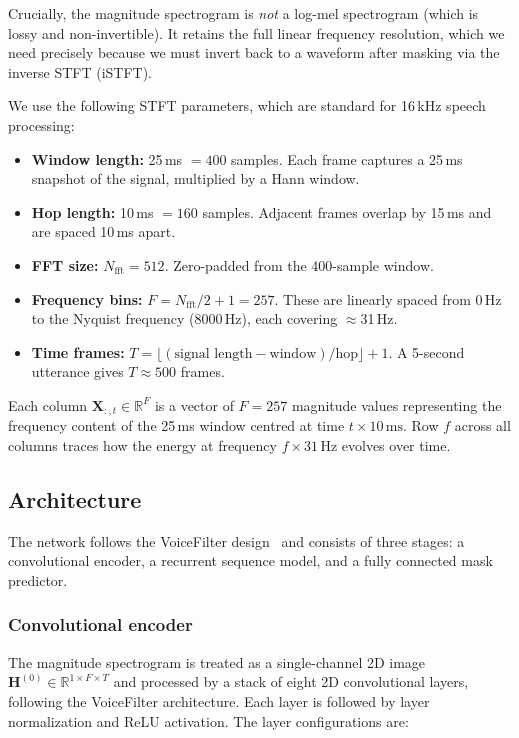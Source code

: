 \documentclass{article}
\begin{document}
Crucially, the magnitude spectrogram is \emph{not} a log-mel spectrogram (which is lossy and non-invertible). It retains the full linear frequency resolution, which we need precisely because we must invert back to a waveform after masking via the inverse STFT (iSTFT).

We use the following STFT parameters, which are standard for 16\,kHz speech processing:
\begin{itemize}
    \item \textbf{Window length:} 25\,ms $= 400$ samples. Each frame captures a 25\,ms snapshot of the signal, multiplied by a Hann window.
    \item \textbf{Hop length:} 10\,ms $= 160$ samples. Adjacent frames overlap by 15\,ms and are spaced 10\,ms apart.
    \item \textbf{FFT size:} $N_{\text{fft}} = 512$. Zero-padded from the 400-sample window.
    \item \textbf{Frequency bins:} $F = N_{\text{fft}}/2 + 1 = 257$. These are linearly spaced from 0\,Hz to the Nyquist frequency (8000\,Hz), each covering $\approx$31\,Hz.
    \item \textbf{Time frames:} $T = \lfloor (\text{signal length} - \text{window}) / \text{hop} \rfloor + 1$. A 5-second utterance gives $T \approx 500$ frames.
\end{itemize}

Each column $\mathbf{X}_{:,t} \in \mathbb{R}^F$ is a vector of $F = 257$ magnitude values representing the frequency content of the 25\,ms window centred at time $t \times 10\,\text{ms}$. Row $f$ across all columns traces how the energy at frequency $f \times 31\,\text{Hz}$ evolves over time.

\subsection{Architecture}

The network follows the VoiceFilter design~\citep{VoiceFilter} and consists of three stages: a convolutional encoder, a recurrent sequence model, and a fully connected mask predictor.

\subsubsection{Convolutional encoder}
The magnitude spectrogram is treated as a single-channel 2D image $\mathbf{H}^{(0)} \in \mathbb{R}^{1 \times F \times T}$ and processed by a stack of eight 2D convolutional layers, following the VoiceFilter architecture. Each layer is followed by layer normalization and ReLU activation. The layer configurations are:
\end{document}
